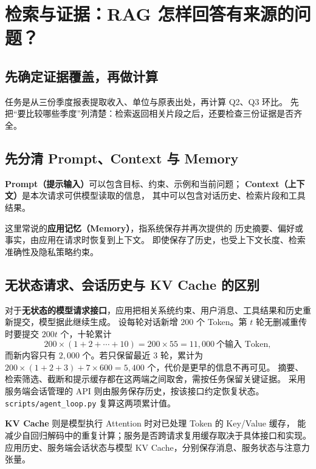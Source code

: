 \chapterrule
\section{检索与证据：RAG 怎样回答有来源的问题？}
\label{intro:23d-agent-systems}

\subsection{先确定证据覆盖，再做计算}
任务是从三份季度报表提取收入、单位与原表出处，再计算 Q2、Q3 环比。
先把“要比较哪些季度”列清楚：检索返回相关片段之后，还要检查三份证据是否齐全。



\subsection{先分清 Prompt、Context 与 Memory}

\label{concept:prompt}\textbf{Prompt（提示输入）}可以包含目标、约束、示例和当前问题；
\label{concept:context}\textbf{Context（上下文）}是本次请求可供模型读取的信息，
其中可以包含对话历史、检索片段和工具结果。

这里常说的\label{concept:app-memory}\textbf{应用记忆（Memory）}，指系统保存并再次提供的
历史摘要、偏好或事实，由应用在请求时恢复到上下文。
即使保存了历史，也受上下文长度、检索准确性及隐私策略约束。


\subsection{无状态请求、会话历史与 KV Cache 的区别}

对于\textbf{无状态的模型请求接口}，应用把相关系统约束、用户消息、工具结果和历史重新提交，模型据此继续生成。
设每轮对话新增 $200$ 个 Token。第 $t$ 轮无删减重传时要提交 $200t$ 个，十轮累计
\[
200\times(1+2+\cdots+10)=200\times55=\boxed{11{,}000}\ \text{个输入 Token},
\]
而新内容只有 $2{,}000$ 个。若只保留最近 $3$ 轮，累计为
$200\times(1+2+3)+7\times600=\boxed{5{,}400}$ 个，代价是更早的信息不再可见。
摘要、检索筛选、截断和提示缓存都在这两端之间取舍，需按任务保留关键证据。
采用服务端会话管理的 API 则由服务保存历史，按该接口约定恢复状态。
\texttt{scripts/agent\_loop.py} 复算这两项累计值。


\textbf{KV Cache} 则是模型执行 Attention 时对已处理 Token 的 Key/Value 缓存，
能减少自回归解码中的重复计算；服务是否跨请求复用缓存取决于具体接口和实现。
应用历史、服务端会话状态与模型 KV Cache，分别保存消息、服务状态与注意力张量。

